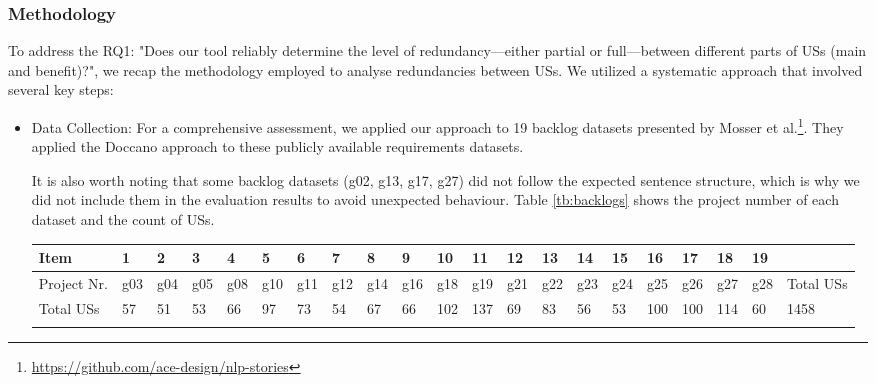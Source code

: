 \subsubsection*{Methodology}
To address the RQ1: "Does our tool reliably determine the level of redundancy—either partial or full—between different parts of USs (main and benefit)?", we recap the methodology employed to analyse redundancies between USs. We utilized a systematic approach that involved several key steps:
\begin{itemize}
	
	\item Data Collection: For a comprehensive assessment, we applied our approach to 19 backlog datasets presented by Mosser et al.\footnote{\href{https://github.com/ace-design/nlp-stories}{https://github.com/ace-design/nlp-stories}}. They applied the Doccano approach to these publicly available requirements datasets\cite{requirementsdatasets}.
	
	It is also worth noting that some backlog datasets (g02, g13, g17, g27) did not follow the expected sentence structure, which is why we did not include them in the evaluation results to avoid unexpected behaviour. Table \ref{tb:backlogs} shows the project number of each dataset and the count of USs.
	
	\begingroup
	\centering
	\scriptsize
	\renewcommand{\arraystretch}{1.5} 
	\begin{tabularx}{\linewidth}{l|XXXXXXXXXXXXXXXXXXX X}
		Item&	1&	2&	3&	4&	5&	6&	7&	8&	9&	10&	11&	12&	13&	14&	15&	16&	17&	18&	19&	\\
		\hline
		Project Nr.&	g03	&g04	&g05	&g08	&g10	&g11	&g12	&g14	&g16	&g18	&g19	&g21	&g22	&g23	&g24	&g25	&g26	&g27	&g28 &Total USs\\
		\hline
		Total USs&	57&	51	&53	&66	&97	&73	&54	&67	&66	&102	&137	&69	&83	&56	&53	&100	&100	&114	&60	&1458 \\
		\caption{Project number and count of USs contained in each backlog dataset}\label{tb:backlogs}
	\end{tabularx}	
	\endgroup
	

\end{itemize}
